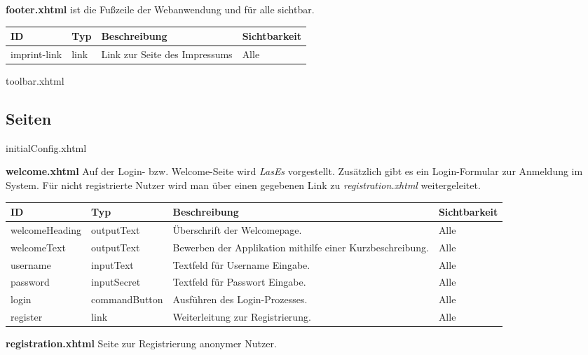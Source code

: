 \textbf{footer.xhtml} ist die Fußzeile der Webanwendung und für alle sichtbar.

\begin{tabular}[H]{|m{2cm}|m{3cm}|m{6cm}|m{2.5cm}|}
	\hline
	\textbf{ID} & \textbf{Typ} & \textbf{Beschreibung} & \textbf{Sichtbarkeit} \\
	\hline
	\hline
	imprint-link & link & Link zur Seite des Impressums & Alle\\
	\hline
\end{tabular}


toolbar.xhtml

\subsection{Seiten}
initialConfig.xhtml

\textbf{welcome.xhtml} Auf der Login- bzw. Welcome-Seite wird \emph{LasEs} vorgestellt.
Zusätzlich gibt es ein Login-Formular zur Anmeldung im System.
Für nicht registrierte Nutzer wird man über einen gegebenen Link zu \emph{registration.xhtml} weitergeleitet.


\begin{tabular}[H]{|m{2cm}|m{3cm}|m{6cm}|m{2.5cm}|}
    \hline
    \textbf{ID} & \textbf{Typ} & \textbf{Beschreibung} & \textbf{Sichtbarkeit} \\
    \hline
    \hline
    welcomeHeading & outputText & Überschrift der Welcomepage. & Alle\\
    \hline
    welcomeText & outputText & Bewerben der Applikation mithilfe einer Kurzbeschreibung. & Alle \\
    \hline
    username & inputText & Textfeld für Username Eingabe. & Alle \\
    \hline
    password & inputSecret & Textfeld für Passwort Eingabe. & Alle \\
    \hline
    login & commandButton & Ausführen des Login-Prozesses. & Alle \\
    \hline
    register & link & Weiterleitung zur Registrierung. & Alle \\
    \hline
\end{tabular}

\textbf{registration.xhtml} Seite zur Registrierung anonymer Nutzer.

